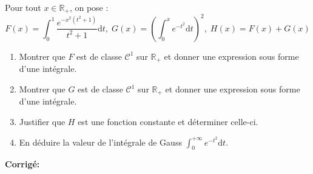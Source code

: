 \documentclass[a4paper,twoside,french,11pt]{VcCours}
\newcommand{\dt}{\text{d}t}
\newcommand{\corr}{\textbf{Corrigé:}}
\begin{document}
\begin{Exercice}{} Pour tout $x \in \mathbb{R}_+$, on pose :
 $$ F(x) = \int_{0}^1 \frac{e^{-x^2(t^2+1)}}{t^2+1} \dt, \; G(x) = \left( \int_{0}^x e^{-t^2} \dt \right)^2, \; H(x)=F(x)+G(x)$$
 
 \begin{enumerate}
 \item Montrer que $F$ est de classe $\mathcal{C}^1$ sur $\mathbb{R}_+$ et donner une expression sous forme d'une intégrale.
 \item Montrer que $G$ est de classe $\mathcal{C}^1$ sur $\mathbb{R}_+$ et donner une expression sous forme d'une intégrale.
 \item Justifier que $H$ est une fonction constante et déterminer celle-ci.
 \item En déduire la valeur de l'intégrale de Gauss $\int_{0}^{+ \infty} e^{-t^2} \dt$.
 \end{enumerate}
\end{Exercice}

\corr 
\end{document}
